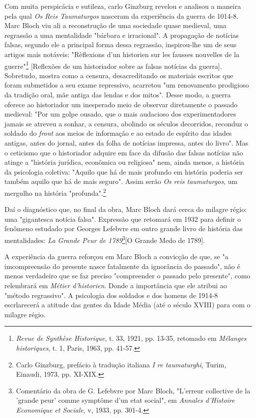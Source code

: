 \documentclass[a5paper]{book}
\begin{document}
Com muita perspicácia e sutileza, carlo Ginzburg revelou e analisou a maneira pela qual \textit{Os Reis Taumaturgos} nasceram da experiência da guerra de 1014-8. Marc Bloch viu ali a reconstrução de uma sociedade quase medieval, uma regrassão a uma mentalidade "bárbara e irracional". A propagação de notícias falsas, segundo ele a principal forma dessa regrassão, inspirou-lhe um de seus artigos mais notáveis: "Rèf{\kern0pt}lexions d'un historien sur les fausses nouvelles de la guerre"\footnote{\textit{Revue de Synthèse Historique}, t. 33, 1921, pp. 13-35, retomado em \textit{Mélanges historiques}, t. 1, Paris, 1963, pp. 41-57.} [Ref{\kern0pt}lexões de um historiador sobre as falsas notícias da guerra]. Sobretudo, mostra como a censura, desacreditando os materiais escritos que foram submetidos a seu exame repressivo, acarretou "um renovamento prodigioso da tradição oral, mãe antiga das lendas e dos mitos". Desse modo, a guerra oferece ao historiador um inesperado meio de observar diretamente o passado medieval: "Por um golpe ousado, que o mais audacioso dos experimentadores jamais se atreveu a sonhar, a censura, abolindo os séculos decorridos, reconduz o soldado do \textit{front} aos meios de informação e ao estado de espírito das idades antigas, antes do jornal, antes da folha de notícias impressa, antes do livro". Mas o ceticismo que o historiador adquire em face da difusão das falsas notícias não atinge a "história jurídica, econômica ou religiosa" nem, ainda menos, a história da psicologia coletiva: "Aquilo que há de mais profundo em história poderia ser também aquilo que há de mais seguro". Assim serão \textit{Os reis taumaturgos}, um mergulho na história "profunda".\footnote{Carlo Ginzburg, prefácio à tradução italiana \textit{I re taumaturghi}, Turim, Einaudi, 1973, pp. XI-XIX.}

Daí o diagnóstico que, no f{\kern0pt}inal da obra, Marc Bloch dará cerca do milagre régio: uma "gigantesca notícia falsa". Expressão que retomará em 1932 para def{\kern0pt}inir o fenômeno estudado por Georges Lefebvre em outro grande livro de história das mentalidades: \textit{La Grande Peur de 1789}\footnote{Comentário da obra de G. Lefebvre por Marc Bloch, "L'erreur collective de la 'grande peur' comme symptôme d'un etat social", em \textit{Annales d'Histoire Economique et Sociale}, v, 1933, pp. 301-4.}[O Grande Medo de 1789].

A experiência da guerra reforçou em Marc Bloch a convicção de que, se "a imcompreensão do presente nasce fatalmente da ignorância do passado", não é menos verdadeiro que se faz preciso "compreender o passado pelo presente", como relembrará em \textit{Métier d'historien}. Donde a importância que ele atribui ao "método regrassivo". A psicologia dos soldados e dos homens de 1914-8 escrlarecerá a atitude das gentes da Idade Média (até o século XVIII) para com o milagre régio.
\end{document}
